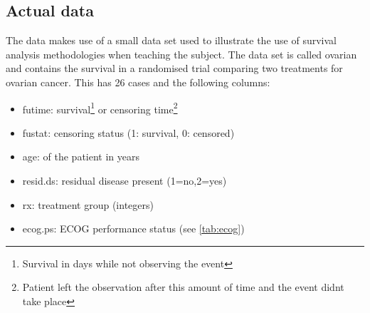 \subsection{Actual data}
The data makes use of a small data set used to illustrate the use of survival analysis methodologies when teaching the subject. The data set is called ovarian and contains the survival in a randomised trial comparing two treatments for ovarian cancer. This has 26 cases and the following columns:
\begin{itemize}

\item futime: survival\footnote{Survival in days while not observing the event} or censoring time\footnote{Patient left the observation after this amount of time and the event didnt take place}
\item fustat: censoring status (1: survival, 0: censored)
\item age: of the patient in years
\item resid.ds: residual disease present (1=no,2=yes) 
\item rx: treatment group (integers)
\item ecog.ps: ECOG performance status (see \autoref{tab:ecog})
\end{itemize}

